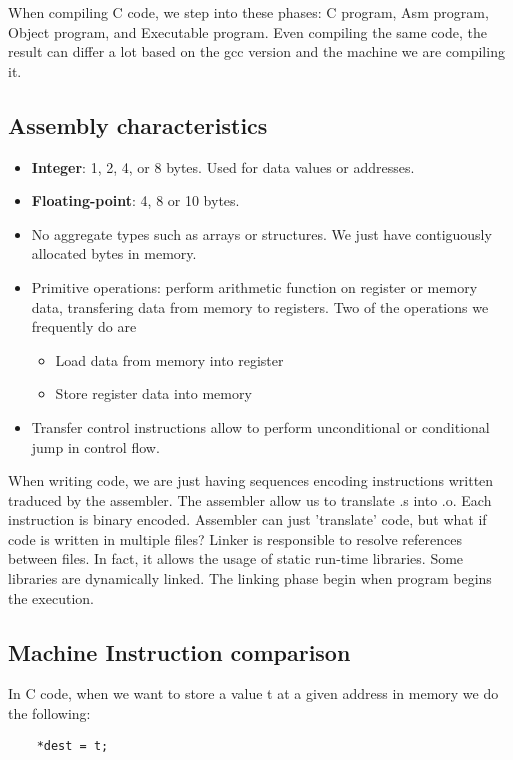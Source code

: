 When compiling C code, we step into these phases:\newline
C program, Asm program, Object program, and Executable program. 
Even compiling the same code, the result can differ a lot based on the gcc version and the machine we are compiling it. 

\subsection{Assembly characteristics}

\begin{itemize}
    \item \textbf{Integer}: 1, 2, 4, or 8 bytes. Used for data values or addresses.
    \item \textbf{Floating-point}: 4, 8 or 10 bytes. 
    \item No aggregate types such as arrays or structures. We just have contiguously allocated bytes in memory. 
    \item Primitive operations: perform arithmetic function on register or memory data, transfering data from memory to registers. Two of the operations we frequently do are
    \begin{itemize}
        \item Load data from memory into register
        \item Store register data into memory
    \end{itemize}
    \item Transfer control instructions allow to perform unconditional or conditional jump in control flow.
\end{itemize}

When writing code, we are just having sequences encoding instructions written traduced by the assembler. The assembler allow us to translate .s into .o. Each instruction is binary encoded. Assembler can just 'translate' code, but what if code is written in multiple files? \newline
Linker is responsible to resolve references between files. In fact, it allows the usage of static run-time libraries. Some libraries are dynamically linked. The linking phase begin when program begins the execution. 

\subsection{Machine Instruction comparison}

In C code, when we want to store a value t at a given address in memory we do the following: 
\begin{lstlisting}
    *dest = t;
\end{lstlisting}

